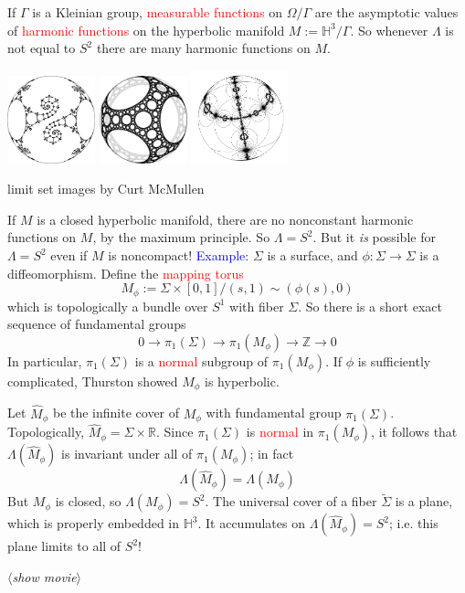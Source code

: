 \documentclass{beamer}
\def\Z{\mathbb{Z}}
\def\R{\mathbb{R}}
\def\H{\mathbb{H}}
\begin{document}
\frame
{
If $\Gamma$ is a Kleinian group, \textcolor{red}{measurable functions} on $\Omega/\Gamma$
are the asymptotic values of \textcolor{red}{harmonic functions} on the hyperbolic
manifold $M:=\H^3/\Gamma$.
\vskip 10pt
So whenever $\Lambda$ is not equal to $S^2$ there are many harmonic functions on $M$.
\begin{center}
\includegraphics[width=1in]{ctm_cusp.png}\hskip 13pt
\includegraphics[width=1in]{ctm_carpet.png}\hskip 8pt
\includegraphics[width=1.1in]{ctm_cylindrical.png}
\end{center}
\begin{center}
\small{limit set images by Curt McMullen}
\end{center}
}
\frame
{
If $M$ is a closed hyperbolic manifold, there are no nonconstant harmonic functions on $M$,
by the \textcolor{dgreen}{maximum principle}. So $\Lambda = S^2$.
\vskip 10pt
But it {\em is} possible for $\Lambda = S^2$ even if $M$ is noncompact!
}
\frame
{
\textcolor{blue}{Example:} $\Sigma$ is a surface, and $\phi:\Sigma \to \Sigma$ is
a diffeomorphism. Define the \textcolor{red}{mapping torus}
$$M_\phi:=\Sigma\times [0,1]/(s,1)\sim(\phi(s),0)$$
which is topologically a bundle over $S^1$ with fiber $\Sigma$. So
there is a short exact sequence of fundamental groups
$$0 \to \pi_1(\Sigma) \to \pi_1(M_\phi) \to \Z \to 0$$
In particular, $\pi_1(\Sigma)$ is a \textcolor{red}{normal} subgroup of $\pi_1(M_\phi)$.
\vskip 10pt
If $\phi$ is sufficiently complicated, Thurston showed $M_\phi$ is hyperbolic.
}
\frame
{
Let $\widehat{M}_\phi$ be the infinite cover of $M_\phi$ with fundamental group
$\pi_1(\Sigma)$. Topologically, $\widehat{M}_\phi = \Sigma \times \R$.
\vskip 10pt
Since $\pi_1(\Sigma)$ is \textcolor{red}{normal} in $\pi_1(M_\phi)$, it follows that
$\Lambda(\widehat{M}_\phi)$ is invariant under all of $\pi_1(M_\phi)$; in fact
$$\Lambda(\widehat{M}_\phi) = \Lambda(M_\phi)$$
But $M_\phi$ is closed, so $\Lambda(M_\phi)=S^2$.
\vskip 10pt
The universal cover of a fiber $\widetilde{\Sigma}$ is a plane, which is properly embedded in
$\H^3$. It accumulates on $\Lambda(\widehat{M}_\phi)=S^2$; i.e.\/ this plane limits to all
of $S^2$!
\vskip 10pt
\begin{center}$\langle${\sl show movie}$\rangle$\end{center}
}
\end{document}

